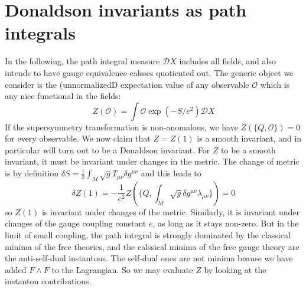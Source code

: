 \section{Donaldson invariants as path integrals}
In the following, the path integral measure $\mathcal{D}X$ includes all fields,
and also intends to have gauge equivalence calsses quotiented out. The generic
object we consider is the (unnormalizedD expectation value of any observable
$\mathcal{O}$ which is any nice functional in the fields:
\[
Z(\mathcal{O}) = \int \mathcal{O} \exp(-S /e^2) \mathcal{D}X
\] 
If the supersymmetry transformation is non-anomalous, we have
$Z(\{Q,\mathcal{O}\})= 0$ for every observable. We now claim that $Z=Z(1)$ is a
smooth invariant, and in particular will turn out to be a Donaldson invariant.
For  $Z$ to be a smooth invariant, it must be invariant under changes in the
metric. The change of metric is by definition  $\delta
S=\frac{1}{2}\int_M\sqrt{g} T_{\mu\nu}\delta g^{\mu\nu}$ and this leads to
\[
	\delta Z(1) = -\frac{1}{e^2}Z(\{Q,\int_M \sqrt{g}\delta
	g^{\mu\nu}\lambda_{\mu\nu}\}) = 0
\] 
so $Z(1)$ is invariant under changes of the metric. Similarly, it is invariant
under changes of the gauge coupling constant  $e$,   as long as it stays
non-zero. But in the limit of small coupling, the path integral is strongly
dominated by the classical minima of the free theories, and the calssical minima
of the free gauge theory are the anti-self-dual instantons. The self-dual ones
are not minima beause we have added $F\wedge F$ to the Lagrangian. So we may
evaluate  $Z$ by looking at the instanton contributions. 



